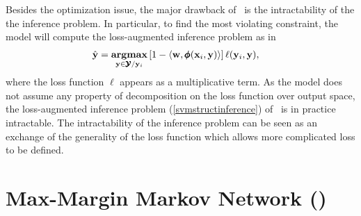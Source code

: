 {Besides the optimization issue, the major drawback of \svmstruct\ is the intractability of the the inference problem.
In particular, to find the most violating constraint, the model will compute the loss-augmented inference problem as in \citep{TJTA05}
\begin{align}
	\hat{\mathbf {y}} = \underset{\mathbf {y}\in\pmb {\mathcal{Y}}/\mathbf {y}_i}{\textbf{argmax}} &\, [1-\langle \mathbf {w}, \pmb \phi(\mathbf {x}_i,\mathbf {y}) \rangle]\,\mathbf {\ell}(\mathbf {y}_i,\mathbf {y}) \label{svmstructinference},
\end{align}
where the loss function $\ell$ appears as a multiplicative term.
As the model does not assume any property of decomposition on the loss function over output space, the loss-augmented inference problem (\ref{svmstructinference}) of \svmstruct\ is in practice intractable. 
The intractability of the inference problem can be seen as an exchange of the generality of the loss function which allows more complicated loss to be defined. 



%
\section{Max-Margin Markov Network (\mmmn)}

}

